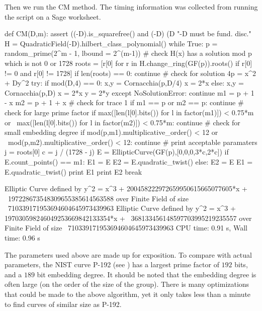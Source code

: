 \documentclass[11pt]{article}
\begin{document}
Then we run the CM method. The timing information was collected from running the script on a Sage worksheet.
\begin{sagecode}
\begin{sagecell}
def CM(D,m):
    assert ((-D).is_squarefree() and (-D)%
    	(D%
    	"-D must be fund. disc."
    H = QuadraticField(-D).hilbert_class_polynomial()
    while True:
        p = random_prime(2^m - 1, lbound = 2^(m-1))
        # check H(x) has a solution mod p which is not 0 or 1728
        roots = [r[0] for r in H.change_ring(GF(p)).roots() if r[0] != 0 and r[0] != 1728]
        if len(roots) == 0:
            continue
        # check for solution 4p = x^2 + Dy^2
        try:
            if mod(D,4) == 0:
                x,y = Cornacchia(p,D/4)
                x = 2*x
            else:
                x,y = Cornacchia(p,D)
                x = 2*x
                y = 2*y
        except NoSolutionError:
            continue
        m1 = p + 1 - x
        m2 = p + 1 + x
        # check for trace 1
        if m1 == p or m2 == p:
            continue
        # check for large prime factor
        if max([len(l[0].bits()) for l in factor(m1)]) < 0.75*m or \
            max([len(l[0].bits()) for l in factor(m2)]) < 0.75*m:
            continue
        # check for small embedding degree
        if mod(p,m1).multiplicative_order() < 12 or \
            mod(p,m2).multiplicative_order() < 12:
            continue
        # print acceptable paramaters
        j = roots[0]
        c = j / (1728 - j)
        E = EllipticCurve(GF(p),[0,0,0,3*c,2*c])
        if E.count_points() == m1:
            E1 = E
            E2 = E.quadratic_twist()
        else:
            E2 = E
            E1 = E.quadratic_twist()
        print E1
        print E2
        break
\end{sagecell}
\begin{sageout}
Elliptic Curve defined by y^2 = x^3 + 200458222972659950615665077605*x + \
197228673548309655385614563588 over Finite Field of size \
710339171953694604645973439963
Elliptic Curve defined by y^2 = x^3 + 197030598246049253669842133354*x + \
368133456148597703995219235557 over Finite Field of size \
710339171953694604645973439963
CPU time: 0.91 s, Wall time: 0.96 s
\end{sageout}
\end{sagecode}

\begin{rem}
	The parameters used above are made up for exposition. To compare with actual parameters, the NIST curve P-192 (see \cite[D.1.2.1, Pg.~90]{fips2013}) has a largest prime factor of $192$ bits, and a $189$ bit embedding degree. It should be noted that the embedding degree is often large (on the order of the size of the group). There is many optimizations that could be made to the above algorithm, yet it only takes less than a minute to find curves of similar size as P-192.
\end{rem}
\end{document}
